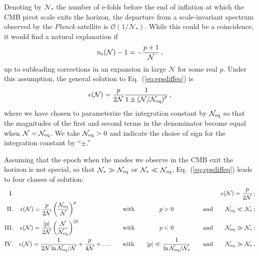 Denoting by $\mathcal{N}_\ast$ the number of e-folds before the end of inflation at which the CMB pivot scale exits the horizon, the departure from a scale-invariant spectrum observed by the {\it Planck\/} satellite is $\mathcal{O}(1/\mathcal{N}_\ast)$. While this could be a coincidence, it would find a natural explanation if 
\begin{equation}\label{eq:nsassump}
n_{\rm s}(\mathcal{N})-1=-\frac{p+1}{\mathcal{N}}\,,
\end{equation}
up to subleading corrections in an expansion in large $\mathcal{N}$ for some real $p$. Under this assumption, the general solution to Eq.~(\ref{eq:epsdiffeq}) is
\begin{equation}\label{eq:epssol}
\epsilon(\mathcal{N})=\frac{p}{2\mathcal{N}}\frac{1}{1\pm\left(\mathcal{N}/\mathcal{N}_{\rm eq}\right)^{p}}\,,
\end{equation}
where we have chosen to parameterize the integration constant by $\mathcal{N}_{\rm eq}$ so that the magnitudes of the first and second terms in the denominator become equal when $\mathcal{N}=\mathcal{N}_{\rm eq}$. We take $\mathcal{N}_{\rm eq}>0$ and indicate the choice of sign for the integration constant by ``$\pm$.''

Assuming that the epoch when the modes we observe in the CMB exit the horizon is not special, so that $\mathcal{N}_\ast\gg\mathcal{N}_{\rm eq}$ or $\mathcal{N}_\ast\ll\mathcal{N}_{\rm eq}$, Eq.~(\ref{eq:epsdiffeq}) leads to four classes of solution:
\begin{eqnarray}
{\rm I.}&&\epsilon(\mathcal{N})=\frac{p}{2\mathcal{N}}\,;\label{eq:classI}\\
{\rm II.}&&\epsilon(\mathcal{N})=\frac{p}{2\mathcal{N}}\left(\frac{\mathcal{N}_{\rm eq}}{\mathcal{N}}\right)^p\hspace{1.92cm}\qquad{\rm with}\qquad \hspace{7.3mm}p>0 \hspace{1.0cm}\qquad{\rm and}\qquad\mathcal{N}_{\rm eq}\ll\mathcal{N}_\ast\,;\label{eq:classII}\\
{\rm III.}&&\epsilon(\mathcal{N})=\frac{|p|}{2\mathcal{N}}\left(\frac{\mathcal{N}}{\mathcal{N}_{\rm eq}}\right)^{|p|}\hspace{1.77cm}\qquad{\rm with}\qquad \hspace{7.3mm}p<0 \hspace{1.0cm}\qquad{\rm and}\qquad\mathcal{N}_{\rm eq}\gg\mathcal{N}_\ast\,;\label{eq:classIII}\\
{\rm IV.}&&\epsilon(\mathcal{N})=\frac{1}{2\mathcal{N}\ln\mathcal{N}_{\rm eq}/\mathcal{N}}+\frac{p}{4\mathcal{N}}+\dots\qquad{\rm with}\qquad |p|\ll\frac{1}{\ln\mathcal{N}_{\rm eq}/\mathcal{N}_\ast}\qquad{\rm and}\qquad \mathcal{N}_{\rm eq}\gg\mathcal{N}_\ast\,.\label{eq:classIV}
\end{eqnarray}


